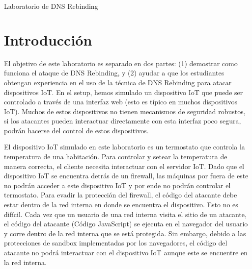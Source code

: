 
\newcommand{\commonfolder}{../../common-files}




\newcommand{\rebindingFigs}{./Figs}





\begin{center}
{\LARGE  Laboratorio de DNS Rebinding}
\end{center}



\setcounter{task}{1}
\newcommand{\tasks} {\bf {\noindent (\arabic{task})} \addtocounter{task}{1} \,}



\section{Introducción}

El objetivo de este laboratorio es separado en dos partes: (1) demostrar como funciona el ataque de DNS Rebinding, y (2) ayudar a que los estudiantes obtengan experiencia en el uso de la técnica de DNS Rebinding para atacar dispositivos IoT. En el setup, hemos simulado un dispositivo IoT que puede ser controlado a través de una interfaz web (esto es típico en muchos dispositivos IoT). Muchos de estos dispositivos no tienen mecanismos de seguridad robustos, si los atacantes pueden interactuar directamente con esta interfaz poco segura, podrán hacerse del control de estos dispositivos.

El dispositivo IoT simulado en este laboratorio es un termostato que controla la temperatura de una habitación.
Para controlar y setear la temperatura de manera correcta, el cliente necesita interactuar con el servidor IoT. Dado que el dispositivo IoT se encuentra detrás de un firewall, las máquinas por fuera de este no podrán acceder a este dispositivo IoT y por ende no podrán controlar el termostato. Para evadir la protección del firewall, el código del atacante debe estar dentro de la red interna en donde se encuentra el dispositivo. Esto no es difícil. Cada vez que un usuario de una red interna visita el sitio de un atacante, el código del atacante (Código JavaScript) se ejecuta en el navegador del usuario y corre dentro de la red interna que se está protegida. Sin embargo, debido a las protecciones de sandbox implementadas por los navegadores, el código del atacante no podrá interactuar con el dispositivo IoT aunque este se encuentre en la red interna.

